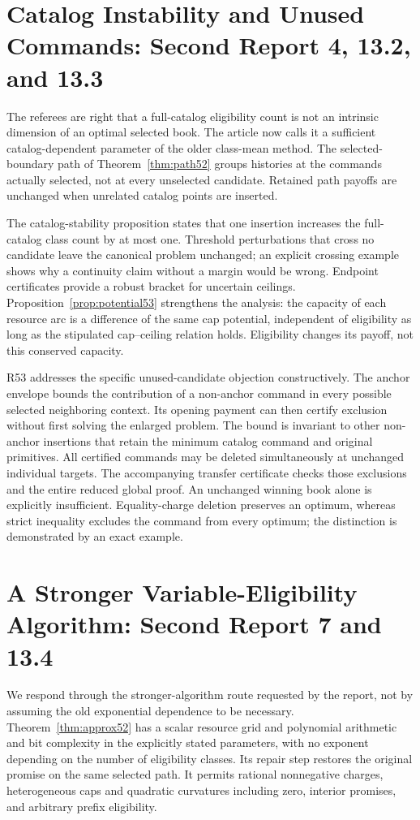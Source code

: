 \section{Catalog Instability and Unused Commands: Second Report 4, 13.2, and 13.3}
The referees are right that a full-catalog eligibility count is not an intrinsic dimension of an optimal selected book. The article now calls it a sufficient catalog-dependent parameter of the older class-mean method. The selected-boundary path of Theorem~\ref{thm:path52} groups histories at the commands actually selected, not at every unselected candidate. Retained path payoffs are unchanged when unrelated catalog points are inserted.

The catalog-stability proposition states that one insertion increases the full-catalog class count by at most one. Threshold perturbations that cross no candidate leave the canonical problem unchanged; an explicit crossing example shows why a continuity claim without a margin would be wrong. Endpoint certificates provide a robust bracket for uncertain ceilings. Proposition~\ref{prop:potential53} strengthens the analysis: the capacity of each resource arc is a difference of the same cap potential, independent of eligibility as long as the stipulated cap--ceiling relation holds. Eligibility changes its payoff, not this conserved capacity.

R53 addresses the specific unused-candidate objection constructively. The anchor envelope bounds the contribution of a non-anchor command in every possible selected neighboring context. Its opening payment can then certify exclusion without first solving the enlarged problem. The bound is invariant to other non-anchor insertions that retain the minimum catalog command and original primitives. All certified commands may be deleted simultaneously at unchanged individual targets. The accompanying transfer certificate checks those exclusions and the entire reduced global proof. An unchanged winning book alone is explicitly insufficient. Equality-charge deletion preserves an optimum, whereas strict inequality excludes the command from every optimum; the distinction is demonstrated by an exact example.

\section{A Stronger Variable-Eligibility Algorithm: Second Report 7 and 13.4}
We respond through the stronger-algorithm route requested by the report, not by assuming the old exponential dependence to be necessary. Theorem~\ref{thm:approx52} has a scalar resource grid and polynomial arithmetic and bit complexity in the explicitly stated parameters, with no exponent depending on the number of eligibility classes. Its repair step restores the original promise on the same selected path. It permits rational nonnegative charges, heterogeneous caps and quadratic curvatures including zero, interior promises, and arbitrary prefix eligibility.

